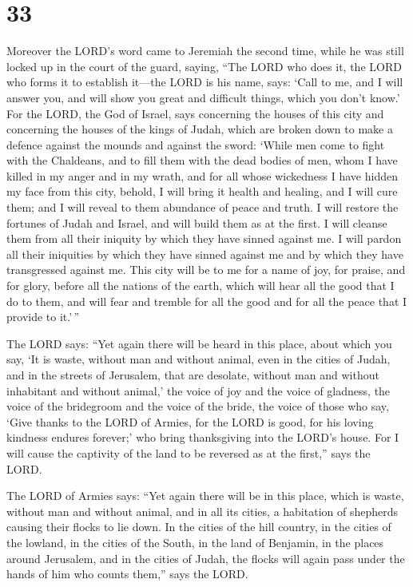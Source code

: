 \hypertarget{section-32}{%
\section{33}\label{section-32}}

 Moreover the LORD's word came to Jeremiah the second
time, while he was still locked up in the court of the guard, saying,
 ``The LORD who does it, the LORD who forms it to
establish it---the LORD is his name, says:  `Call to me,
and I will answer you, and will show you great and difficult things,
which you don't know.'  For the LORD, the God of Israel,
says concerning the houses of this city and concerning the houses of the
kings of Judah, which are broken down to make a defence against the
mounds and against the sword:  `While men come to fight
with the Chaldeans, and to fill them with the dead bodies of men, whom I
have killed in my anger and in my wrath, and for all whose wickedness I
have hidden my face from this city,  behold, I will bring
it health and healing, and I will cure them; and I will reveal to them
abundance of peace and truth.  I will restore the fortunes
of Judah and Israel, and will build them as at the first. 
I will cleanse them from all their iniquity by which they have sinned
against me. I will pardon all their iniquities by which they have sinned
against me and by which they have transgressed against me.
 This city will be to me for a name of joy, for praise,
and for glory, before all the nations of the earth, which will hear all
the good that I do to them, and will fear and tremble for all the good
and for all the peace that I provide to it.'\,''

 The LORD says: ``Yet again there will be heard in this
place, about which you say, `It is waste, without man and without
animal, even in the cities of Judah, and in the streets of Jerusalem,
that are desolate, without man and without inhabitant and without
animal,'  the voice of joy and the voice of gladness, the
voice of the bridegroom and the voice of the bride, the voice of those
who say, `Give thanks to the LORD of Armies, for the LORD is good, for
his loving kindness endures forever;' who bring thanksgiving into the
LORD's house. For I will cause the captivity of the land to be reversed
as at the first,'' says the LORD.

 The LORD of Armies says: ``Yet again there will be in
this place, which is waste, without man and without animal, and in all
its cities, a habitation of shepherds causing their flocks to lie down.
 In the cities of the hill country, in the cities of the
lowland, in the cities of the South, in the land of Benjamin, in the
places around Jerusalem, and in the cities of Judah, the flocks will
again pass under the hands of him who counts them,'' says the LORD.

